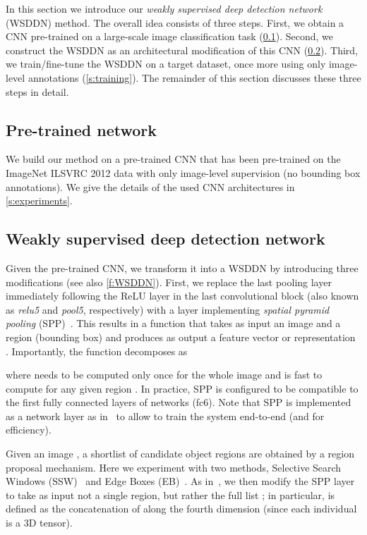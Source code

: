 \documentclass[10pt,twocolumn,letterpaper]{article}
\begin{document}
 
In this section we introduce our \emph{weakly supervised deep detection network} (WSDDN) method. The overall idea consists of three steps. First, we obtain a CNN pre-trained on a large-scale image classification task (\cref{s:pretrained}). Second, we construct the WSDDN as an architectural modification of this CNN (\cref{s:WSDDN}). Third, we train/fine-tune the WSDDN on a target dataset, once more using only image-level annotations (\cref{s:training}). The remainder of this section discusses these three steps in detail.
 
\subsection{Pre-trained network}\label{s:pretrained}
We build our method on a pre-trained CNN that has been pre-trained on the ImageNet ILSVRC 2012 data \cite{Russakovsky15} with only image-level supervision (\ie no bounding box annotations). We give the details of the used CNN architectures in \cref{s:experiments}. 
\subsection{Weakly supervised deep detection network}\label{s:WSDDN}


Given the pre-trained CNN, we transform it into a WSDDN by introducing three modifications (see also \cref{f:WSDDN}). First, we replace the last pooling layer immediately following the ReLU layer in the last convolutional block (also known as \textit{relu5} and \textit{pool5}, respectively) with a layer implementing \emph{spatial pyramid pooling} (SPP)~\cite{Lazebnik06,He14}. This results in a function that takes as input an image  and a region (bounding box)  and produces as output a feature vector or representation . Importantly, the function decomposes as

where  needs to be computed only once for the whole image and  is fast to compute for any given region . In practice, SPP is configured to be compatible to the first fully connected layers of networks (\ie fc6). Note that SPP is implemented as a network layer as in~\cite{Girshick15} to allow to train the system end-to-end (and for efficiency).

Given an image , a shortlist of candidate object regions  are obtained by a region proposal mechanism. Here we experiment with two methods, Selective Search Windows (SSW)~\cite{Sande11} and Edge Boxes (EB)~\cite{Zitnick14}. As in~\cite{Girshick15}, we then modify the SPP layer to take as input not a single region, but rather the full list ; in particular,  is defined as the concatenation of  along the fourth dimension (since each individual  is a 3D tensor).
\end{document}
